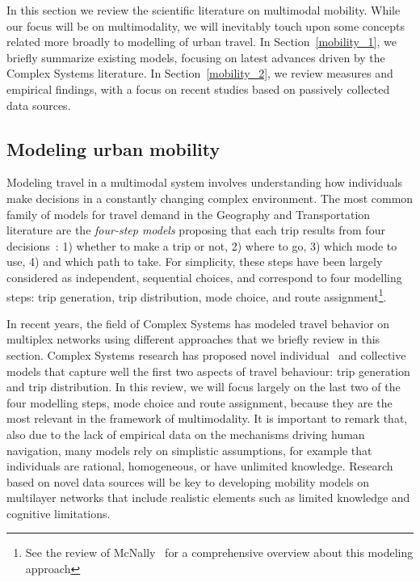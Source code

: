 In this section we review the scientific literature on multimodal mobility. While our focus will be on multimodality, we will inevitably touch upon some concepts related more broadly to modelling of urban travel. In Section~\ref{mobility_1}, we briefly summarize existing models, focusing on latest advances driven by the Complex Systems literature. In Section~\ref{mobility_2}, we review measures and empirical findings, with a focus on recent studies based on passively collected data sources. 

\subsection{Modeling urban mobility \label{mobility_1}}

Modeling travel in a multimodal system involves understanding how individuals make decisions in a constantly changing complex environment. The most common family of models for travel demand in the Geography and Transportation literature are the \emph{four-step models} proposing that each trip results from four decisions~\cite{mcnally2000four}: 1) whether to make a trip or not, 2) where to go, 3) which mode to use, 4) and which path to take. For simplicity, these steps have been largely considered as independent, sequential choices, and correspond to four modelling steps: trip generation, trip distribution, mode choice, and route assignment\footnote{See the review of McNally~\cite{mcnally2000four} for a comprehensive overview about this modeling approach}.

In recent years, the field of Complex Systems has modeled travel behavior on multiplex networks using different approaches that we briefly review in this section. Complex Systems research has proposed novel individual~\cite{song2010modelling,jiang2016timegeo,alessandretti2020scales} and collective~\cite{simini2012universal,schlapfer2020hidden} models that capture well the first two aspects of travel behaviour: trip generation and trip distribution. In this review, we will focus largely on the last two of the four modelling steps, mode choice and route assignment, because they are the most relevant in the framework of multimodality. It is important to remark that, also due to the lack of empirical data on the mechanisms driving human navigation, many models rely on simplistic assumptions, for example that individuals are rational, homogeneous, or have unlimited knowledge. Research based on novel data sources will be key to developing mobility models on multilayer networks that include realistic elements such as limited knowledge and cognitive limitations.


